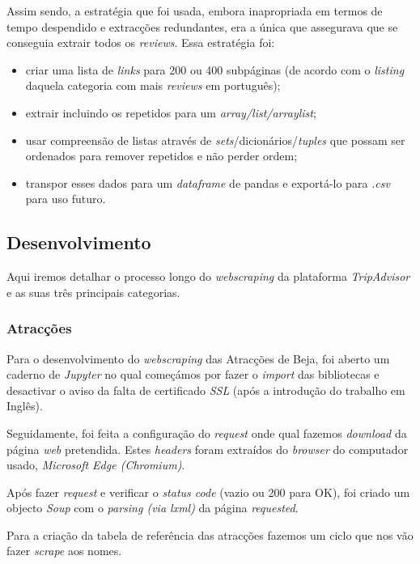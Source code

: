 Assim sendo, a estratégia que foi usada, embora inapropriada em termos de tempo despendido e extracções redundantes, era a única que assegurava que se conseguia extrair todos os \textit{reviews}. Essa estratégia foi:
\begin{itemize}
  \setlength\itemsep{0.05em}
  \item criar uma lista de \textit{links} para 200 ou 400 subpáginas (de acordo com o \textit{listing} daquela categoria com mais \textit{reviews} em português);
  \item extrair incluindo os repetidos para um \textit{array/list/arraylist};
  \item usar compreensão de listas através de \textit{sets}/dicionários/\textit{tuples} que possam ser ordenados para remover repetidos e não perder ordem;
  \item transpor esses dados para um \textit{dataframe} de pandas e exportá-lo para \textit{.csv} para uso futuro.
\end{itemize}

\subsection{Desenvolvimento}

Aqui iremos detalhar o processo longo do \textit{webscraping} da plataforma \textit{TripAdvisor} e as suas três principais categorias.

\subsubsection{Atracções}
Para o desenvolvimento do \textit{webscraping} das Atracções de Beja, foi aberto um caderno de \textit{Jupyter} no qual começámos por fazer o \textit{import} das bibliotecas e desactivar o aviso da falta de certificado \textit{SSL} (após a introdução do trabalho em Inglês).

Seguidamente, foi feita a configuração do \textit{request} onde qual fazemos \textit{download} da página \textit{web} pretendida. Estes \textit{headers} foram extraídos do \textit{browser} do computador usado, \textit{Microsoft Edge (Chromium)}.

Após fazer \textit{request} e verificar o \textit{status code} (vazio ou 200 para OK), foi criado um objecto \textit{Soup} com o \textit{parsing (via lxml)} da página \textit{requested}.

Para a criação da tabela de referência das atracções fazemos um ciclo que nos vão fazer \textit{scrape} aos nomes.

